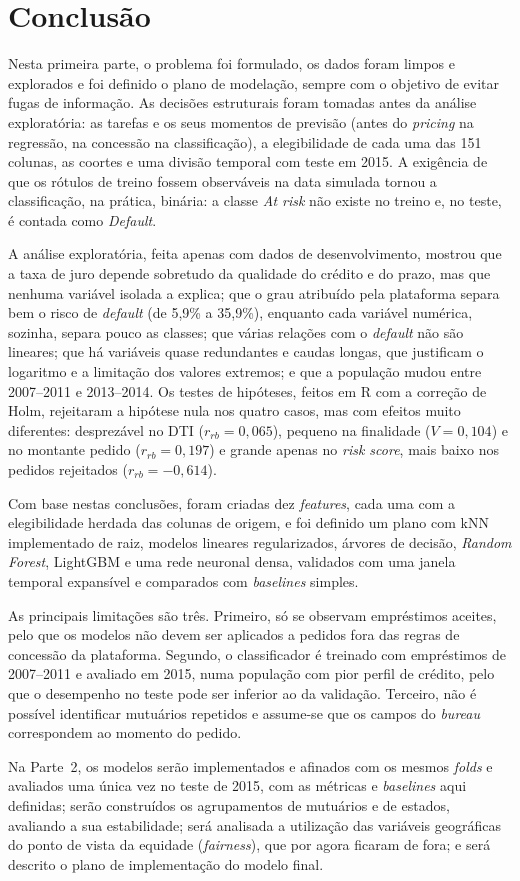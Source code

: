 \section{Conclusão}
\label{sec:conclusao}

Nesta primeira parte, o problema foi formulado, os dados foram limpos e explorados e foi definido o plano de modelação, sempre com o objetivo de evitar fugas de informação. As decisões estruturais foram tomadas antes da análise exploratória: as tarefas e os seus momentos de previsão (antes do \textit{pricing} na regressão, na concessão na classificação), a elegibilidade de cada uma das 151 colunas, as coortes e uma divisão temporal com teste em 2015. A exigência de que os rótulos de treino fossem observáveis na data simulada tornou a classificação, na prática, binária: a classe \textit{At risk} não existe no treino e, no teste, é contada como \textit{Default}.

A análise exploratória, feita apenas com dados de desenvolvimento, mostrou que a taxa de juro depende sobretudo da qualidade do crédito e do prazo, mas que nenhuma variável isolada a explica; que o grau atribuído pela plataforma separa bem o risco de \textit{default} (de 5,9\% a 35,9\%), enquanto cada variável numérica, sozinha, separa pouco as classes; que várias relações com o \textit{default} não são lineares; que há variáveis quase redundantes e caudas longas, que justificam o logaritmo e a limitação dos valores extremos; e que a população mudou entre 2007--2011 e 2013--2014. Os testes de hipóteses, feitos em R com a correção de Holm, rejeitaram a hipótese nula nos quatro casos, mas com efeitos muito diferentes: desprezável no DTI ($r_{rb} = 0{,}065$), pequeno na finalidade ($V = 0{,}104$) e no montante pedido ($r_{rb} = 0{,}197$) e grande apenas no \textit{risk score}, mais baixo nos pedidos rejeitados ($r_{rb} = -0{,}614$).

Com base nestas conclusões, foram criadas dez \textit{features}, cada uma com a elegibilidade herdada das colunas de origem, e foi definido um plano com kNN implementado de raiz, modelos lineares regularizados, árvores de decisão, \textit{Random Forest}, LightGBM e uma rede neuronal densa, validados com uma janela temporal expansível e comparados com \textit{baselines} simples.

As principais limitações são três. Primeiro, só se observam empréstimos aceites, pelo que os modelos não devem ser aplicados a pedidos fora das regras de concessão da plataforma. Segundo, o classificador é treinado com empréstimos de 2007--2011 e avaliado em 2015, numa população com pior perfil de crédito, pelo que o desempenho no teste pode ser inferior ao da validação. Terceiro, não é possível identificar mutuários repetidos e assume-se que os campos do \textit{bureau} correspondem ao momento do pedido.

Na Parte~2, os modelos serão implementados e afinados com os mesmos \textit{folds} e avaliados uma única vez no teste de 2015, com as métricas e \textit{baselines} aqui definidas; serão construídos os agrupamentos de mutuários e de estados, avaliando a sua estabilidade; será analisada a utilização das variáveis geográficas do ponto de vista da equidade (\textit{fairness}), que por agora ficaram de fora; e será descrito o plano de implementação do modelo final.
